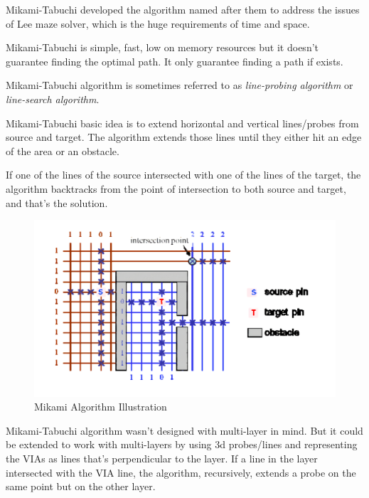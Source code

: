 Mikami-Tabuchi developed the algorithm named after them \cite{mikami1968computer} to address the issues of Lee maze solver, which is the huge requirements of time and space.

Mikami-Tabuchi is simple, fast, low on memory resources but it doesn't guarantee finding the optimal path. It only guarantee finding a path if exists.

Mikami-Tabuchi algorithm is sometimes referred to as \textit{line-probing algorithm} or \textit{line-search algorithm}.

Mikami-Tabuchi basic idea is to extend horizontal and vertical lines/probes from source and target. The algorithm extends those lines until they either hit an edge of the area or an obstacle.

If one of the lines of the source intersected with one of the lines of the target, the algorithm backtracks from the point of intersection to both source and target, and that's the solution.

\begin{figure}[H]
    \centering
    \includegraphics[width=\linewidth]{figures/mikami.png}
    \caption{Mikami Algorithm Illustration \cite{chen2009global}}
    \label{fig:mikamiIllustr}
\end{figure}

Mikami-Tabuchi algorithm wasn't designed with multi-layer in mind. But it could be extended to work with multi-layers by using 3d probes/lines and representing the VIAs as lines that's perpendicular to the layer. If a line in the layer intersected with the VIA line, the algorithm, recursively, extends a probe on the same point but on the other layer.

